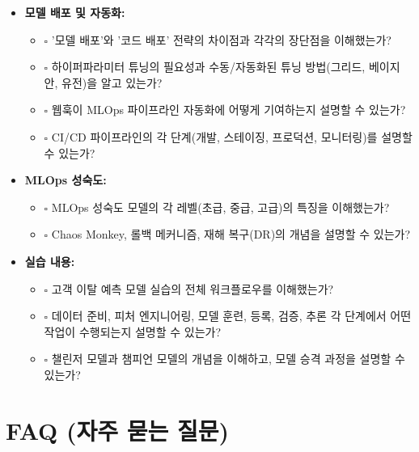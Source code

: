 \documentclass[11pt,a4paper]{article}
\begin{document}
\begin{itemize}
\begin{itemize}
    \end{itemize}
    \item \textbf{모델 배포 및 자동화:}
    \begin{itemize}
        \item $\square$ '모델 배포'와 '코드 배포' 전략의 차이점과 각각의 장단점을 이해했는가?
        \item $\square$ 하이퍼파라미터 튜닝의 필요성과 수동/자동화된 튜닝 방법(그리드, 베이지안, 유전)을 알고 있는가?
        \item $\square$ 웹훅이 MLOps 파이프라인 자동화에 어떻게 기여하는지 설명할 수 있는가?
        \item $\square$ CI/CD 파이프라인의 각 단계(개발, 스테이징, 프로덕션, 모니터링)를 설명할 수 있는가?
    \end{itemize}
    \item \textbf{MLOps 성숙도:}
    \begin{itemize}
        \item $\square$ MLOps 성숙도 모델의 각 레벨(초급, 중급, 고급)의 특징을 이해했는가?
        \item $\square$ Chaos Monkey, 롤백 메커니즘, 재해 복구(DR)의 개념을 설명할 수 있는가?
    \end{itemize}
    \item \textbf{실습 내용:}
    \begin{itemize}
        \item $\square$ 고객 이탈 예측 모델 실습의 전체 워크플로우를 이해했는가?
        \item $\square$ 데이터 준비, 피처 엔지니어링, 모델 훈련, 등록, 검증, 추론 각 단계에서 어떤 작업이 수행되는지 설명할 수 있는가?
        \item $\square$ 챌린저 모델과 챔피언 모델의 개념을 이해하고, 모델 승격 과정을 설명할 수 있는가?
    \end{itemize}
\end{itemize}

\newpage
\section{FAQ (자주 묻는 질문)}
\end{document}
